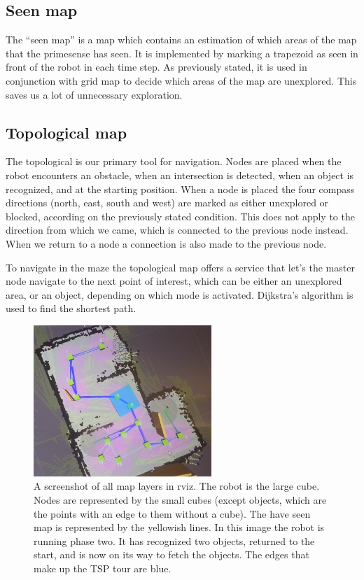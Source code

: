 \subsection{Seen map}
The ``seen map'' is a map which contains an estimation of which areas of the map that the primesense has seen. 
It is implemented by marking a trapezoid as seen in front of the robot in each time step. 
As previously stated, it is used in conjunction with grid map to decide which areas of the map are unexplored. 
This saves us a lot of unnecessary exploration.

\subsection{Topological map}
The topological is our primary tool for navigation. Nodes are placed when the robot encounters an obstacle, when an intersection is detected, when an object is recognized, and at the starting position. When a node is placed the four compass directions (north, east, south and west) are marked as either unexplored or blocked, according on the previously stated condition. This does not apply to the direction from which we came, which is connected to the previous node instead. When we return to a node a connection is also made to the previous node.

To navigate in the maze the topological map offers a service that let's the master node navigate to the next point of interest, which can be either an unexplored area, or an object, depending on which mode is activated. Dijkstra's algorithm is used to find the shortest path.

\begin{figure}[h]
\begin{center}
\includegraphics[width=0.6\textwidth]{figures/map.png}
\end{center}
\caption{A screenshot of all map layers in rviz. The robot is the large cube. Nodes are represented by the small cubes (except objects, which are the points with an edge to them without a cube). The have seen map is represented by the yellowish lines. In this image the robot is running phase two. It has recognized two objects, returned to the start, and is now on its way to fetch the objects. The edges that make up the TSP tour are blue.}
\label{fig:arch_controller}
\end{figure}

